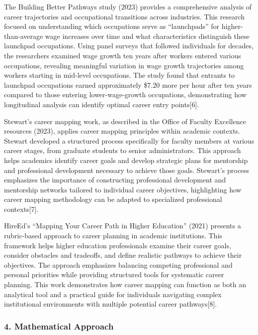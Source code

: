 \documentclass[./main.tex]{subfiles}
\begin{document}
The Building Better Pathways study (2023) provides a comprehensive
analysis of career trajectories and occupational transitions across
industries. This research focused on understanding which occupations
serve as ``launchpads'' for higher-than-average wage increases over time
and what characteristics distinguish these launchpad occupations. Using
panel surveys that followed individuals for decades, the researchers
examined wage growth ten years after workers entered various
occupations, revealing meaningful variation in wage growth trajectories
among workers starting in mid-level occupations. The study found that
entrants to launchpad occupations earned approximately \$7.20 more per
hour after ten years compared to those entering lower-wage-growth
occupations, demonstrating how longitudinal analysis can identify
optimal career entry points{[}6{]}.

Stewart's career mapping work, as described in the Office of Faculty
Excellence resources (2023), applies career mapping principles within
academic contexts. Stewart developed a structured process specifically
for faculty members at various career stages, from graduate students to
senior administrators. This approach helps academics identify career
goals and develop strategic plans for mentorship and professional
development necessary to achieve those goals. Stewart's process
emphasizes the importance of constructing professional development and
mentorship networks tailored to individual career objectives,
highlighting how career mapping methodology can be adapted to
specialized professional contexts{[}7{]}.

HireEd's ``Mapping Your Career Path in Higher Education'' (2021)
presents a rubric-based approach to career planning in academic
institutions. This framework helps higher education professionals
examine their career goals, consider obstacles and tradeoffs, and define
realistic pathways to achieve their objectives. The approach emphasizes
balancing competing professional and personal priorities while providing
structured tools for systematic career planning. This work demonstrates
how career mapping can function as both an analytical tool and a
practical guide for individuals navigating complex institutional
environments with multiple potential career pathways{[}8{]}.

\subsubsection{4. Mathematical Approach}\label{mathematical-approach}
\end{document}
